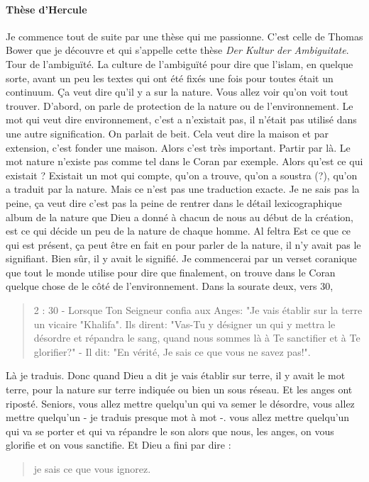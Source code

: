 \paragraph{Thèse d'Hercule}Je commence tout de suite par une thèse qui me passionne. C'est celle de Thomas Bower que je découvre et qui s'appelle cette thèse \textit{Der Kultur der Ambiguitate}. Tour de l'ambiguïté. La culture de l'ambiguïté pour dire que l'islam, en quelque sorte, avant un peu les textes qui ont été fixés une fois pour toutes était un continuum.
Ça veut dire qu'il y a sur la nature. Vous allez voir qu'on voit tout trouver. D'abord, on parle de protection de la nature ou de l'environnement. Le mot qui veut dire environnement, c'est a n'existait pas, il n'était pas utilisé dans une autre signification. On parlait de beit. Cela veut dire la maison et par extension, c'est fonder une maison.
Alors c'est très important. Partir par là. Le mot nature n'existe pas comme tel dans le Coran par exemple. Alors qu'est ce qui existait ? Existait un mot qui compte, qu'on a trouve, qu'on a soustra (?), qu'on a traduit par la nature. Mais ce n'est pas une traduction exacte. Je ne sais pas la peine, ça veut dire c'est pas la peine de rentrer dans le détail lexicographique album de la nature que Dieu a donné à chacun de nous au début de la création, est ce qui décide un peu de la nature de chaque homme. Al feltra
Est ce que ce qui est présent, ça peut être en fait en pour parler de la nature, il n'y avait pas le signifiant. Bien sûr, il y avait le signifié. Je commencerai par un verset coranique que tout le monde utilise pour dire que finalement, on trouve dans le Coran quelque chose de le côté de l'environnement. Dans la sourate deux, vers 30,
\begin{quote}
    2 : 30 - Lorsque Ton Seigneur confia aux Anges: "Je vais établir sur la terre un vicaire "Khalifa". Ils dirent: "Vas-Tu y désigner un qui y mettra le désordre et répandra le sang, quand nous sommes là à Te sanctifier et à Te glorifier?" - Il dit: "En vérité, Je sais ce que vous ne savez pas!".
\end{quote}
  Là je traduis. Donc quand Dieu a dit je vais établir sur terre, il y avait le mot terre, pour la nature sur terre indiquée ou bien un sous réseau. Et les anges ont riposté. Seniors, vous allez mettre quelqu'un qui va semer le désordre, vous allez mettre quelqu'un - je traduis presque mot à mot -.
vous allez mettre quelqu'un qui va se porter et qui va répandre le son alors que nous, les anges, on vous glorifie et on vous sanctifie. Et Dieu a fini par dire :
\begin{quote}
     je sais ce que vous ignorez.
\end{quote}
